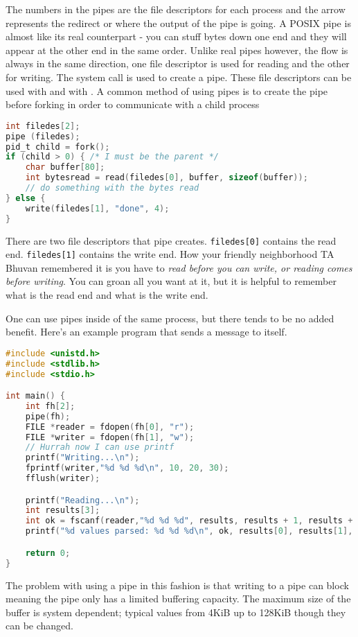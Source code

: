 The numbers in the pipes are the file descriptors for each process and the arrow represents the redirect or where the output of the pipe is going.
A POSIX pipe is almost like its real counterpart - you can stuff bytes down one end and they will appear at the other end in the same order.
Unlike real pipes however, the flow is always in the same direction, one file descriptor is used for reading and the other for writing.
The  system call is used to create a pipe.
These file descriptors can be used with  and with . A common method of using pipes is to create the pipe before forking in order to communicate with a child process

\begin{lstlisting}[language=C]
int filedes[2];
pipe (filedes);
pid_t child = fork();
if (child > 0) { /* I must be the parent */
    char buffer[80];
    int bytesread = read(filedes[0], buffer, sizeof(buffer));
    // do something with the bytes read
} else {
	write(filedes[1], "done", 4);
}
\end{lstlisting}

There are two file descriptors that pipe creates.
\texttt{filedes[0]} contains the read end.
\texttt{filedes[1]} contains the write end.
How your friendly neighborhood TA Bhuvan remembered it is you have to \textit{read before you can write, or reading comes before writing}.
You can groan all you want at it, but it is helpful to remember what is the read end and what is the write end.

One can use pipes inside of the same process, but there tends to be no added benefit.
Here's an example program that sends a message to itself.

\begin{lstlisting}[language=C]
#include <unistd.h>
#include <stdlib.h>
#include <stdio.h>

int main() {
    int fh[2];
    pipe(fh);
    FILE *reader = fdopen(fh[0], "r");
    FILE *writer = fdopen(fh[1], "w");
    // Hurrah now I can use printf
    printf("Writing...\n");
    fprintf(writer,"%d %d %d\n", 10, 20, 30);
    fflush(writer);

    printf("Reading...\n");
    int results[3];
    int ok = fscanf(reader,"%d %d %d", results, results + 1, results + 2);
    printf("%d values parsed: %d %d %d\n", ok, results[0], results[1], results[2]);

    return 0;
}
\end{lstlisting}

The problem with using a pipe in this fashion is that writing to a pipe can block meaning the pipe only has a limited buffering capacity.
The maximum size of the buffer is system dependent; typical values from 4KiB up to 128KiB though they can be changed.

